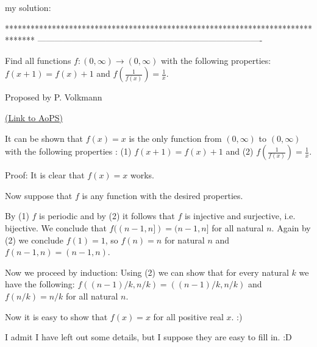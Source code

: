 \begin{mysolution}
	my solution:
\end{mysolution}
*******************************************************************************
-------------------------------------------------------------------------------

\begin{problem}
	Find all functions $f: (0,\infty)\rightarrow(0,\infty)$ with the following properties: $f(x+1)=f(x)+1$  and $f\left(\frac{1}{f(x)}\right)=\frac{1}{x}$.

\begin{italicized}Proposed by P. Volkmann\end{italicized}
	\flushright \href{https://artofproblemsolving.com/community/c6h102430}{(Link to AoPS)}
\end{problem}



\begin{mysolution}
	It can be shown that $f(x)=x$ is the only function from $(0,\infty)$ to  $(0,\infty)$ 
with the following properties :
(1) $f(x+1)=f(x)+1$
and
(2) $f\left(\frac{1}{f(x)}\right)=\frac{1}{x}$. 

Proof: It is clear that $f(x)=x$ works. 

Now suppose that $f$ is any function with the desired properties. 

By (1) $f$ is periodic and by (2) it follows that $f$ is injective and surjective, i.e. bijective. 
We conclude that $f( (n-1,n] ) = (n-1,n]$ for all natural $n$. Again by (2) 
we conclude $f(1)=1$, so $f(n)=n$ for natural $n$ and $f(n-1,n)=(n-1,n)$. 

Now we proceed by induction: 
Using (2) we can show that for every natural $k$ we have the following: 
$f( (n-1)/k,n/k ) = ((n-1)/k,n/k)$ and $f(n/k)=n/k$ for all natural $n$.

Now it is easy to show that $f(x) = x$ for all positive real $x$.  :)

I admit I have left out some details, but I suppose they are easy to fill in.  :D
\end{mysolution}



